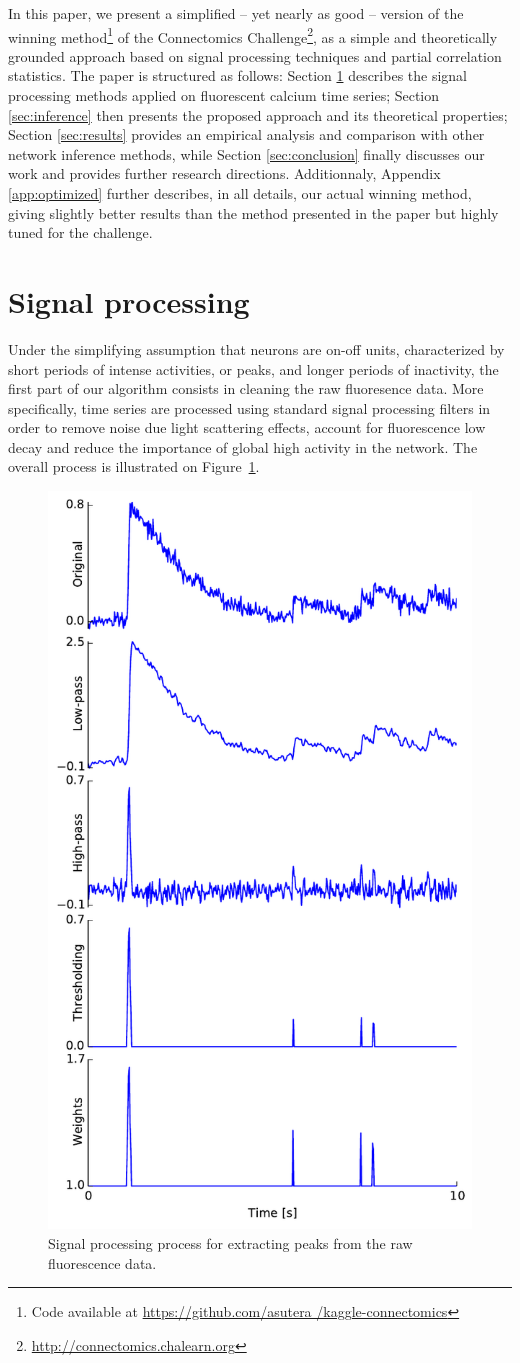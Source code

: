\documentclass[wcp]{jmlr}
\begin{document}
In this paper, we present a simplified -- yet nearly as good -- version of the
winning method\footnote{Code available at \url{https://github.com/asutera
/kaggle-connectomics}} of the Connectomics
Challenge\footnote{\url{http://connectomics.chalearn.org}}, as a simple and
theoretically grounded approach based on signal processing techniques and
partial correlation statistics. The paper is structured as follows: Section
\ref{sec:filter} describes the signal processing methods applied on fluorescent
calcium time series; Section \ref{sec:inference} then presents the proposed
approach and its theoretical properties; Section \ref{sec:results} provides an
empirical analysis and comparison with other network inference methods, while
Section \ref{sec:conclusion} finally discusses our work and provides further
research directions. Additionnaly, Appendix \ref{app:optimized} further
describes, in all details, our actual winning method, giving slightly better
results than the method presented in the paper but highly tuned for the
challenge.


\section{Signal processing} \label{sec:filter}

Under the simplifying assumption that neurons are on-off units, characterized
by short periods of intense activities, or peaks, and longer periods of
inactivity, the first part of our algorithm consists in cleaning the raw
fluoresence data. More specifically, time series are processed using standard
signal processing filters in order to remove noise due light scattering
effects, account for fluorescence  low decay and reduce the importance of
global high activity in the network. The overall process is illustrated on
Figure~\ref{fig:filtered-signal}.

\begin{figure}
\centering
\includegraphics[width=0.4\linewidth]{images/fig_filtering}
\caption{Signal processing process for extracting peaks from the raw fluorescence data.}
\label{fig:filtered-signal}
\end{figure}
\end{document}
